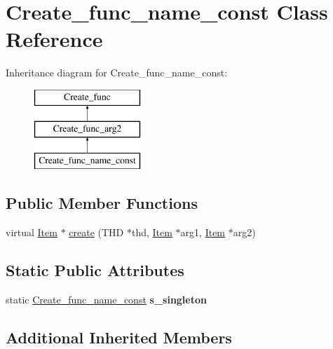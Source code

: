 \hypertarget{classCreate__func__name__const}{}\section{Create\+\_\+func\+\_\+name\+\_\+const Class Reference}
\label{classCreate__func__name__const}
Inheritance diagram for Create\+\_\+func\+\_\+name\+\_\+const\+:\begin{figure}[H]
\begin{center}
\leavevmode
\includegraphics[height=3.000000cm]{classCreate__func__name__const}
\end{center}
\end{figure}
\subsection*{Public Member Functions}
\begin{DoxyCompactItemize}
\item 
virtual \mbox{\hyperlink{classItem}{Item}} $\ast$ \mbox{\hyperlink{classCreate__func__name__const_ac11321b6b3fed16cbbeb51453b7d0b29}{create}} (T\+HD $\ast$thd, \mbox{\hyperlink{classItem}{Item}} $\ast$arg1, \mbox{\hyperlink{classItem}{Item}} $\ast$arg2)
\end{DoxyCompactItemize}
\subsection*{Static Public Attributes}
\begin{DoxyCompactItemize}
\item 
\mbox{\label{classCreate__func__name__const_a98d845f3b8f86b3c48a767d08a37d137}} 
static \mbox{\hyperlink{classCreate__func__name__const}{Create\+\_\+func\+\_\+name\+\_\+const}} {\bfseries s\+\_\+singleton}
\end{DoxyCompactItemize}
\subsection*{Additional Inherited Members}


